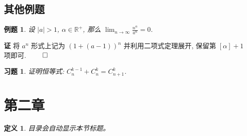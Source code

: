 \documentclass[12pt,a4paper,fontset=none]{ctexart}
\newcounter{theorem_counter}
\theoremstyle{bluehead}
\newtheorem{definition}{定义}[subsection]
\theoremstyle{greenhead}
\theoremstyle{yellowhead}
\newtheorem{exercise}{习题}[subsection]
\theoremstyle{redhead}
\newtheorem{example}{例题}[subsection]
\begin{document}
\subsection{其他例题}

\begin{example}
  设 $|a|>1$, $\alpha \in \mathbb{R^+}$, 那么 $\displaystyle \lim_{n \to \infty}\frac{n^\alpha}{a^n}=0$.
\end{example}

\hspace{-2em} \textbf{证} \quad 将 $a^n$ 形式上记为 $(1+(a-1))^n$ 并利用二项式定理展开, 保留第 $[\alpha]+1$ 项即可. \hfill\(\qed\)

\vspace{0.2cm}

\begin{exercise}
  证明恒等式: $\displaystyle C_{n}^{k-1}+C_{n}^{k}=C_{n+1}^k$.
\end{exercise}

\newpage

\section{第二章}

\begin{definition}
目录会自动显示本节标题。
\end{definition}
\end{document}
